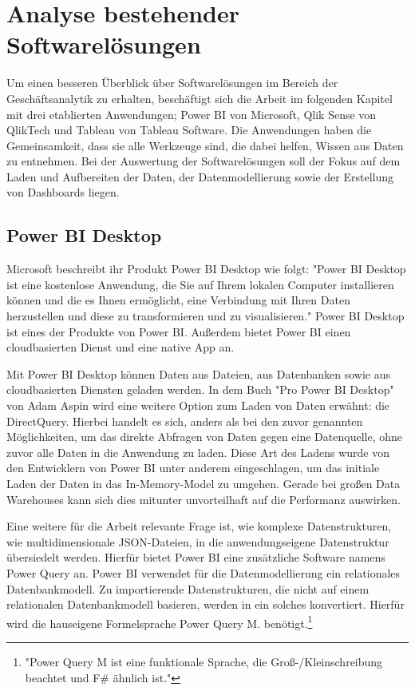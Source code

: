 \chapter{Analyse bestehender Softwarelösungen}
\label{chap:analysebestehendersoftwareloesungen}

Um einen besseren Überblick über Softwarelösungen im Bereich der Geschäftsanalytik zu erhalten, beschäftigt sich
die Arbeit im folgenden Kapitel mit drei etablierten Anwendungen; Power BI von
Microsoft, Qlik Sense von QlikTech und Tableau von Tableau Software.
Die Anwendungen haben die Gemeinsamkeit, dass sie alle Werkzeuge sind,
die dabei helfen, Wissen aus Daten zu entnehmen. Bei der Auswertung
der Softwarelösungen soll der Fokus auf dem Laden und Aufbereiten der Daten,
der Datenmodellierung sowie der Erstellung von Dashboards liegen.

\section{Power BI Desktop}
\label{sec:powerbidesktop}

Microsoft beschreibt ihr Produkt Power BI Desktop wie folgt: "Power BI Desktop ist eine kostenlose Anwendung,
die Sie auf Ihrem lokalen Computer installieren können und die es Ihnen ermöglicht, eine Verbindung mit Ihren
Daten herzustellen und diese zu transformieren und zu visualisieren."\cite{MicrosoftPowerBIDesktopDocs}
Power BI Desktop ist eines der Produkte von Power BI. Außerdem bietet Power BI einen cloudbasierten Dienst
und eine native App an.\cite{WikiPowerBI}

Mit Power BI Desktop können Daten aus Dateien, aus Datenbanken sowie
aus cloudbasierten Diensten geladen werden. In dem Buch "Pro Power BI Desktop"
von Adam Aspin wird eine weitere Option zum Laden von Daten erwähnt: die DirectQuery.
Hierbei handelt es sich, anders als bei den zuvor genannten Möglichkeiten, um das direkte
Abfragen von Daten gegen eine Datenquelle, ohne zuvor alle Daten in die Anwendung zu laden.\cite[S. 111]{ProPowerBIDesktop}
Diese Art des Ladens wurde von den Entwicklern von Power BI unter anderem eingeschlagen,
um das initiale Laden der Daten in das In-Memory-Model zu umgehen. Gerade bei großen Data Warehouses
kann sich dies mitunter unvorteilhaft auf die Performanz auswirken.

Eine weitere für die Arbeit relevante Frage ist, wie komplexe Datenstrukturen, wie multidimensionale JSON-Dateien,
in die anwendungseigene Datenstruktur übersiedelt werden. Hierfür bietet Power BI eine zusätzliche Software
namens Power Query an. Power BI verwendet für die Datenmodellierung ein relationales Datenbankmodell.\cite[S. 319]{ProPowerBIDesktop}
Zu importierende Datenstrukturen, die nicht auf einem relationalen Datenbankmodell basieren, werden
in ein solches konvertiert. Hierfür wird die hauseigene Formelsprache Power Query M. benötigt.\footnote{"Power Query M ist eine funktionale Sprache,
die Groß-/Kleinschreibung beachtet und F\# ähnlich ist."\cite{MicrosoftDocsPowerQueryFormelsprache}}

